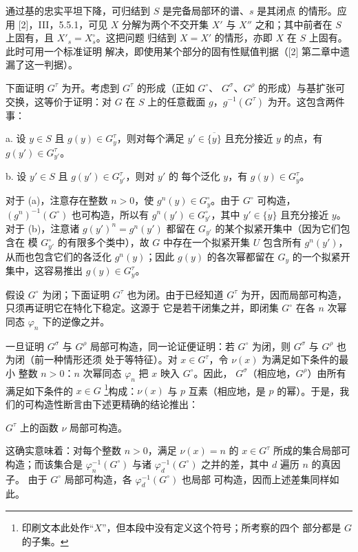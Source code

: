 通过基的忠实平坦下降，可归结到 $S$ 是完备局部环的谱、$s$ 是其闭点
的情形。应用 [2]，III，5.5.1，可见 $X$ 分解为两个不交开集 $X'$ 与
$X''$ 之和；其中前者在 $S$ 上固有，且 $X'_s=X_s^\circ$。这把问题
归结到 $X=X'$ 的情形，亦即 $X$ 在 $S$ 上固有。此时可用一个标准证明
解决，即使用某个部分的固有性赋值判据（[2] 第二章中遗漏了这一判据）。

下面证明 $G^\tau$ 为开。考虑到 $G^\tau$ 的形成（正如 $G^\circ$、
$G^\sigma$、$G^\rho$ 的形成）与基扩张可交换，这等价于证明：对 $G$
在 $S$ 上的任意截面 $g$，$g^{-1}(G^\tau)$ 为开。这包含两件事：

\medskip
\noindent a. 设 $y\in S$ 且 $g(y)\in G_y^\tau$，则对每个满足
$y'\in\overline{\{y\}}$ 且充分接近 $y$ 的点，有
$g(y')\in G_{y'}^\tau$。

\medskip
\noindent b. 设 $y'\in S$ 且 $g(y')\in G_{y'}^\tau$，则对 $y'$ 的
每个泛化 $y$，有 $g(y)\in G_y^\tau$。

对于 (a)，注意存在整数 $n>0$，使 $g^n(y)\in G_y^\circ$。由于
$G^\circ$ 可构造，$(g^n)^{-1}(G^\circ)$ 也可构造，所以有
$g^n(y')\in G_{y'}^\circ$，其中 $y'\in\overline{\{y\}}$ 且充分接近
$y$。对于 (b)，注意诸
$g(y')^n=g^n(y')$ 都留在 $G_{y'}$ 的某个拟紧开集中（因为它们包含在
模 $G_{y'}^\circ$ 的有限多个类中），故 $G$ 中存在一个拟紧开集 $U$
包含所有 $g^n(y')$，从而也包含它们的各泛化 $g^n(y)$；因此
$g(y)$ 的各次幂都留在 $G_y$ 的一个拟紧开集中，这容易推出
$g(y)\in G_y^\tau$。

假设 $G^\circ$ 为闭；下面证明 $G^\tau$ 也为闭。由于已经知道
$G^\tau$ 为开，因而局部可构造，只须再证明它在特化下稳定。这源于
它是若干闭集之并，即闭集 $G^\circ$ 在各 $n$ 次幂同态
$\varphi_n$ 下的逆像之并。

一旦证明 $G^\sigma$ 与 $G^\rho$ 局部可构造，同一论证便证明：若
$G^\circ$ 为闭，则 $G^\sigma$ 与 $G^\rho$ 也为闭（前一种情形还须
处于等特征）。对 $x\in G^\tau$，令 $\nu(x)$ 为满足如下条件的最小
整数 $n>0$：$n$ 次幂同态 $\varphi_n$ 把 $x$ 映入 $G^\circ$。因此，
$G^\sigma$（相应地，$G^\rho$）由所有满足如下条件的 $x\in G$
\footnote{印刷文本此处作“$X$”，但本段中没有定义这个符号；所考察的四个
部分都是 $G$ 的子集。}构成：$\nu(x)$ 与 $p$ 互素（相应地，是 $p$
的幂）。于是，我们的可构造性断言由下述更精确的结论推出：

 $G^\tau$ 上的函数 $\nu$ 局部可构造。

这确实意味着：对每个整数 $n>0$，满足 $\nu(x)=n$ 的
$x\in G^\tau$ 所成的集合局部可构造；而该集合是
$\varphi_n^{-1}(G^\circ)$ 与诸
$\varphi_d^{-1}(G^\circ)$ 之并的差，其中 $d$ 遍历 $n$ 的真因子。
由于 $G^\circ$ 局部可构造，各 $\varphi_d^{-1}(G^\circ)$ 也局部
可构造，因而上述差集同样如此。


